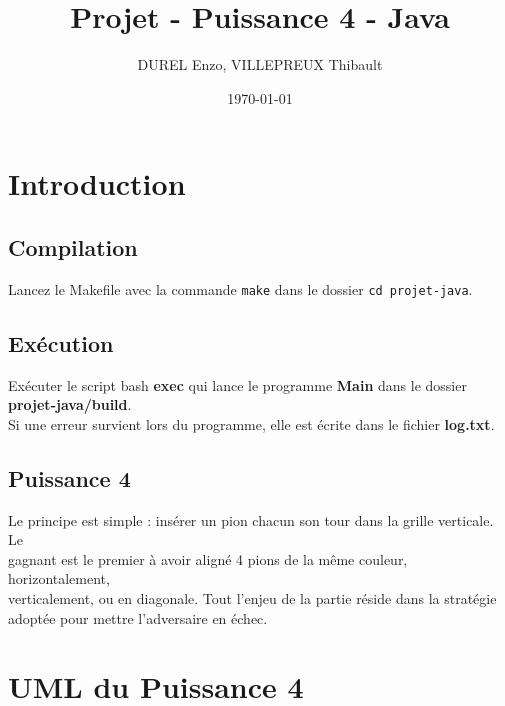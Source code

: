 \documentclass[11pt]{article}
\author{DUREL Enzo, VILLEPREUX Thibault}
\date{\today}
\title{Projet - Puissance 4 - Java}
\begin{document}
\maketitle
\tableofcontents

\thispagestyle{fancy}

\newpage

\section{Introduction}
\label{sec:orgd1a5943}

\subsection{Compilation}
\label{sec:orgdb57576}

Lancez le Makefile avec la commande \texttt{make} dans le dossier \texttt{cd projet-java}.\\

\subsection{Exécution}
\label{sec:orga77af6e}

Exécuter le script bash \textbf{exec} qui lance le programme \textbf{Main} dans le dossier\\
\textbf{projet-java/build}.\\

Si une erreur survient lors du programme, elle est écrite dans le fichier \textbf{log.txt}.\\

\subsection{Puissance 4}
\label{sec:org7c6623c}

Le principe est simple : insérer un pion chacun son tour dans la grille verticale. Le\\
gagnant est le premier à avoir aligné 4 pions de la même couleur, horizontalement,\\
verticalement, ou en diagonale. Tout l'enjeu de la partie réside dans la stratégie\\
adoptée pour mettre l'adversaire en échec.\\


\newpage

\section{UML du Puissance 4}
\label{sec:org0249ede}
\end{document}

